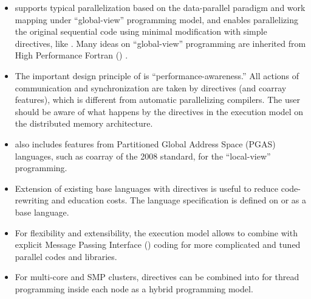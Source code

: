\begin{itemize}

 \item {\XMP} supports typical parallelization based on the
       data-parallel paradigm and work mapping under ``global-view''
       programming model, and enables parallelizing the original
       sequential code using minimal modification with simple
       directives, like {\OMP} \cite{omp}. Many ideas on ``global-view''
       programming are inherited from High Performance Fortran ({\HPF})
       \cite{hpf}.

 \item The important design principle of {\XMP} is
       ``performance-awareness.'' All actions of communication and
       synchronization are taken by directives (and coarray features),
       which is different from automatic parallelizing compilers. The
       user should be aware of what happens by the {\XMP} directives in
       the execution model on the distributed memory architecture.

 \item {\XMP} also includes features from Partitioned Global Address
       Space (PGAS) languages, such as coarray of the {\Fort} 2008
       standard, for the ``local-view'' programming.

 \item Extension of existing base languages with directives is useful to
       reduce code-rewriting and education costs. The {\XMP} language
       specification is defined on {\Fort} or {\C} as a base
       language.

 \item For flexibility and extensibility, the execution model allows to
       combine with explicit Message Passing Interface ({\MPI})
       \cite{mpi} coding for more complicated and tuned parallel codes
       and libraries.

 \item For multi-core and SMP clusters, {\OMP} directives can be
       combined into {\XMP} for thread programming inside each node as a
       hybrid programming model.


\end{itemize}
